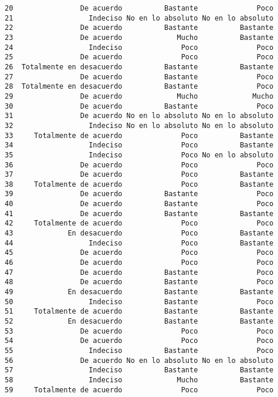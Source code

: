 \documentclass[
  letterpaper,
  DIV=11,
  numbers=noendperiod]{scrartcl}
\begin{document}
\begin{verbatim}
20                De acuerdo          Bastante              Poco
21                  Indeciso No en lo absoluto No en lo absoluto
22                De acuerdo          Bastante          Bastante
23                De acuerdo             Mucho          Bastante
24                  Indeciso              Poco              Poco
25                De acuerdo              Poco              Poco
26  Totalmente en desacuerdo          Bastante          Bastante
27                De acuerdo          Bastante              Poco
28  Totalmente en desacuerdo          Bastante              Poco
29                De acuerdo             Mucho             Mucho
30                De acuerdo          Bastante              Poco
31                De acuerdo No en lo absoluto No en lo absoluto
32                  Indeciso No en lo absoluto No en lo absoluto
33     Totalmente de acuerdo              Poco          Bastante
34                  Indeciso              Poco          Bastante
35                  Indeciso              Poco No en lo absoluto
36                De acuerdo              Poco              Poco
37                De acuerdo              Poco          Bastante
38     Totalmente de acuerdo              Poco          Bastante
39                De acuerdo          Bastante              Poco
40                De acuerdo          Bastante              Poco
41                De acuerdo          Bastante          Bastante
42     Totalmente de acuerdo              Poco              Poco
43             En desacuerdo              Poco          Bastante
44                  Indeciso              Poco          Bastante
45                De acuerdo              Poco              Poco
46                De acuerdo              Poco              Poco
47                De acuerdo          Bastante              Poco
48                De acuerdo          Bastante              Poco
49             En desacuerdo          Bastante          Bastante
50                  Indeciso          Bastante              Poco
51     Totalmente de acuerdo          Bastante          Bastante
52             En desacuerdo          Bastante          Bastante
53                De acuerdo              Poco              Poco
54                De acuerdo              Poco              Poco
55                  Indeciso          Bastante              Poco
56                De acuerdo No en lo absoluto No en lo absoluto
57                  Indeciso          Bastante          Bastante
58                  Indeciso             Mucho          Bastante
59     Totalmente de acuerdo              Poco              Poco

\end{verbatim}
\end{document}
